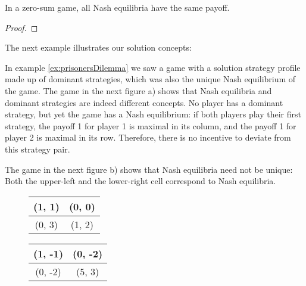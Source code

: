 \documentclass[a4paper]{scrreprt}
\begin{document}
    \begin{lemma}
        In a zero-sum game, all Nash equilibria have the same payoff.
    \end{lemma}
    \begin{proof}
    \end{proof}
    
    The next example illustrates our solution concepts:
    
    \begin{ex}
        In example \ref{ex:prisonersDilemma} we saw a game with a solution strategy profile made up of dominant strategies, which was also the unique Nash equilibrium of the game.
        The game in 
        the next figure a) %
        shows that Nash equilibria and dominant strategies are indeed different concepts. No player has a dominant strategy, but yet the game has a Nash equilibrium: if both players play their first strategy, the payoff 1 for player 1 is maximal in its column, and the payoff 1 for player 2 is maximal in its row. Therefore, there is no incentive to deviate from this strategy pair.
        
        The game in
        the next figure b) %
        shows that Nash equilibria need not be unique: Both the upper-left and the lower-right cell correspond to Nash equilibria.
        
        \begin{figure}[h]
            \centering
            \begin{tabular}{|c|c|}
                \hline
                (1, 1) & (0, 0) \\ 
                \hline
                (0, 3) & (1, 2) \\
                \hline
            \end{tabular}
            \begin{tabular}{|c|c|}
                \hline
                (1, -1) & (0, -2) \\ 
                \hline
                (0, -2) & (5, 3) \\
                \hline
            \end{tabular}
        \end{figure}
    \end{ex}
    
\end{document}
